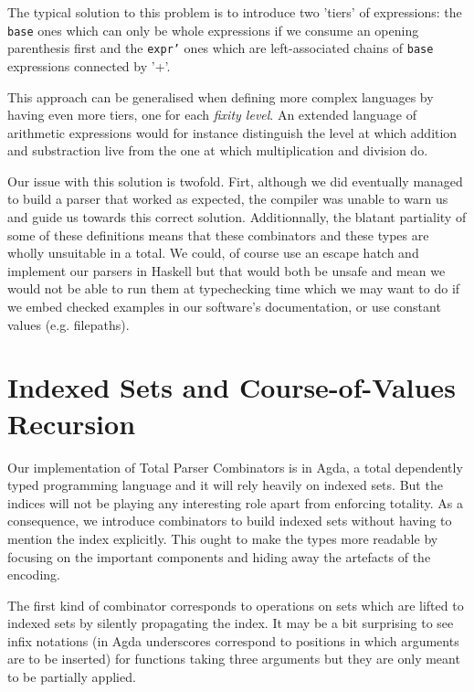\documentclass[sigplan,review,anonymous]{acmart}\settopmatter{printfolios=true}
\newcommand{\shgrab}[1]{\bigskip\ExecuteMetaData[parser.tex]{#1}}
\newcommand{\hgrab}[1]{\ExecuteMetaData[parser.tex]{#1}}
\newcommand{\parser}[1]{\texttt{#1}}
\begin{document}
The typical solution to this problem is to introduce two 'tiers'
of expressions: the \parser{base} ones which can only be whole
expressions if we consume an opening parenthesis first and the
\parser{expr'} ones which are left-associated chains of \parser{base}
expressions connected by '+'.

\shgrab{base}
\hgrab{expr2}

This approach can be generalised when defining more complex
languages by having even more tiers, one for each
\emph{fixity level}. An extended language of arithmetic
expressions would for instance distinguish the level at
which addition and substraction live from the one at which
multiplication and division do.


Our issue with this solution is twofold. Firt, although we did
eventually managed to build a parser that worked as expected,
the compiler was unable to warn us and guide us towards this
correct solution. Additionnally, the blatant partiality of
some of these definitions means that these combinators and
these types are wholly unsuitable in a total. We could, of
course use an escape hatch and implement our parsers in Haskell
but that would both be unsafe and mean we would not be able
to run them at typechecking time which we may want to do if
we embed checked examples in our software's documentation,
or use constant values (e.g. filepaths).

\section{Indexed Sets and Course-of-Values Recursion}

Our implementation of Total Parser Combinators is in Agda,
a total dependently typed programming language and it will
rely heavily on indexed sets. But the indices will not be
playing any interesting role apart from enforcing totality.
As a consequence, we introduce combinators to build indexed
sets without having to mention the index explicitly. This
ought to make the types more readable by focusing on the
important components and hiding away the artefacts of the
encoding.

The first kind of combinator corresponds to operations on
sets which are lifted to indexed sets by silently propagating
the index. It may be a bit surprising to see infix notations
(in Agda underscores correspond to positions in which arguments
are to be inserted) for functions taking three arguments but
they are only meant to be partially applied.
\end{document}
